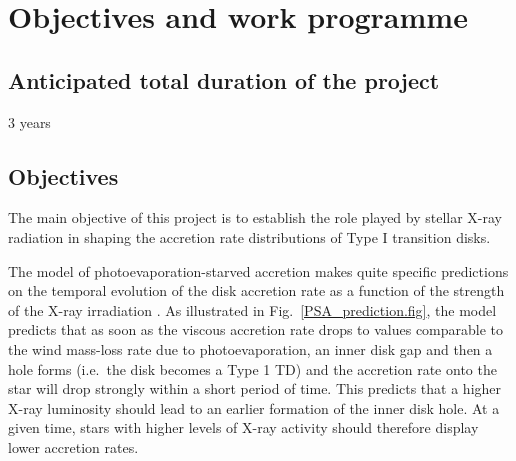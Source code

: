 \documentclass[10pt,fleqn,twoside,a4paper]{article}
\begin{document}



\section{Objectives and work programme}
\renewcommand{\leftmark}{\sc Objectives and work programme}


\subsection{Anticipated total duration of the project}

3 years

\subsection{Objectives}

\begin{highlight}
The main objective of this project is to establish the role played by
stellar X-ray radiation in shaping the accretion rate distributions of
Type I transition disks.
\end{highlight}
%
The model of photoevaporation-starved accretion makes quite specific
predictions on the temporal evolution of the disk accretion rate
as a function of the strength of the X-ray irradiation \citep{Drake09,Owen11}.
As illustrated in Fig.~\ref{PSA_prediction.fig}, the model predicts that
as soon as the viscous accretion rate drops to values comparable to
the wind mass-loss rate due to photoevaporation, an inner disk gap and
then a hole forms
 (i.e.\ the disk becomes a Type 1 TD) and the accretion rate onto the star will drop strongly within a short period
of time.
This predicts that a higher X-ray luminosity should lead to
an earlier formation of the inner disk hole. At a given time, 
stars with higher levels of X-ray activity should therefore display
lower accretion rates.
\end{document}
